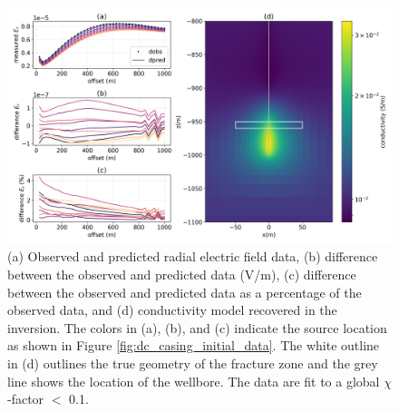 \begin{figure}
    \begin{center}
    \includegraphics[width=1\textwidth]{figures/inversion/dc_smooth_inversion_1e-01.png}
    \end{center}
\caption{
    (a) Observed and predicted radial electric field data,
    (b) difference between the observed and predicted data (V/m),
    (c) difference between the observed and predicted data as a percentage of the observed data,
    and (d) conductivity model recovered in the inversion.
    The colors in (a), (b), and (c) indicate the source location as shown in Figure \ref{fig:dc_casing_initial_data}.
    The white outline in (d) outlines the true geometry of the fracture zone and the grey line shows the location of the wellbore.
    The data are fit to a global $\chi$-factor $<$ 0.1.
}
\label{fig:dc_smooth_inversion_1e-01}
\end{figure}
